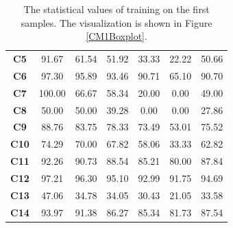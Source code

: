 \begin{table}[ht!]
{\begin{tabular}{c|cccccc}
\rowcolor[HTML]{DAE8E5} 
{\color[HTML]{000000} \textbf{C5}} & {\color[HTML]{000000} 91.67} & {\color[HTML]{000000} 61.54} & {\color[HTML]{000000} 51.92} & {\color[HTML]{000000} 33.33} & {\color[HTML]{000000} 22.22} & {\color[HTML]{000000} 50.66} \\
\rowcolor[HTML]{EEF9FB} 
{\color[HTML]{000000} \textbf{C6}} & {\color[HTML]{000000} 97.30} & {\color[HTML]{000000} 95.89} & {\color[HTML]{000000} 93.46} & {\color[HTML]{000000} 90.71} & {\color[HTML]{000000} 65.10} & {\color[HTML]{000000} 90.70} \\
\rowcolor[HTML]{DAE8E5} 
{\color[HTML]{000000} \textbf{C7}} & {\color[HTML]{000000} 100.00} & {\color[HTML]{000000} 66.67} & {\color[HTML]{000000} 58.34} & {\color[HTML]{000000} 20.00} & {\color[HTML]{000000} 0.00} & {\color[HTML]{000000} 49.00} \\
\rowcolor[HTML]{EEF9FB} 
{\color[HTML]{000000} \textbf{C8}} & {\color[HTML]{000000} 50.00} & {\color[HTML]{000000} 50.00} & {\color[HTML]{000000} 39.28} & {\color[HTML]{000000} 0.00} & {\color[HTML]{000000} 0.00} & {\color[HTML]{000000} 27.86} \\
\rowcolor[HTML]{DAE8E5} 
{\color[HTML]{000000} \textbf{C9}} & {\color[HTML]{000000} 88.76} & {\color[HTML]{000000} 83.75} & {\color[HTML]{000000} 78.33} & {\color[HTML]{000000} 73.49} & {\color[HTML]{000000} 53.01} & {\color[HTML]{000000} 75.52} \\
\rowcolor[HTML]{EEF9FB} 
{\color[HTML]{000000} \textbf{C10}} & {\color[HTML]{000000} 74.29} & {\color[HTML]{000000} 70.00} & {\color[HTML]{000000} 67.82} & {\color[HTML]{000000} 58.06} & {\color[HTML]{000000} 33.33} & {\color[HTML]{000000} 62.82} \\
\rowcolor[HTML]{DAE8E5} 
{\color[HTML]{000000} \textbf{C11}} & {\color[HTML]{000000} 92.26} & {\color[HTML]{000000} 90.73} & {\color[HTML]{000000} 88.54} & {\color[HTML]{000000} 85.21} & {\color[HTML]{000000} 80.00} & {\color[HTML]{000000} 87.84} \\
\rowcolor[HTML]{EEF9FB} 
{\color[HTML]{000000} \textbf{C12}} & {\color[HTML]{000000} 97.21} & {\color[HTML]{000000} 96.30} & {\color[HTML]{000000} 95.10} & {\color[HTML]{000000} 92.99} & {\color[HTML]{000000} 91.75} & {\color[HTML]{000000} 94.69} \\
\rowcolor[HTML]{DAE8E5} 
{\color[HTML]{000000} \textbf{C13}} & {\color[HTML]{000000} 47.06} & {\color[HTML]{000000} 34.78} & {\color[HTML]{000000} 34.05} & {\color[HTML]{000000} 30.43} & {\color[HTML]{000000} 21.05} & {\color[HTML]{000000} 33.58} \\
\rowcolor[HTML]{EEF9FB} 
{\color[HTML]{000000} \textbf{C14}} & {\color[HTML]{000000} 93.97} & {\color[HTML]{000000} 91.38} & {\color[HTML]{000000} 86.27} & {\color[HTML]{000000} 85.34} & {\color[HTML]{000000} 81.73} & {\color[HTML]{000000} 87.54} \\
\bottomrule
\end{tabular}
}
\caption{The statistical values of training on the first samples. The visualization is shown in Figure \ref{CM1Boxplot}.}
\label{CM1BoxplotValues}
\end{table}

